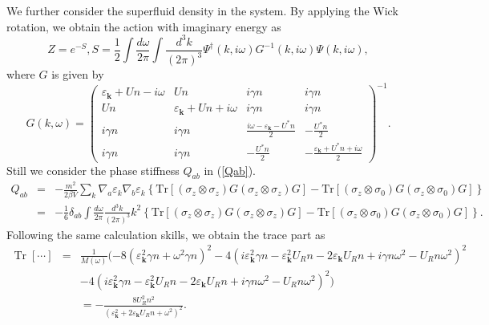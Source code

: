 \documentclass{article}
\newcommand{\nobracket}{}
\newcommand{\tmmathbf}[1]{\ensuremath{\boldsymbol{#1}}}
\newcommand{\tmop}[1]{\ensuremath{\operatorname{#1}}}
\begin{document}
We further consider the superfluid density in the system. By applying the
Wick rotation, we obtain the action with imaginary energy as
\begin{equation}
  Z = e^{- S}, S = \frac{1}{2} \int \frac{d \omega}{2 \pi} \int \frac{d^3
  k}{(2 \pi)^3} \Psi^{\dagger} (k, i \omega) G^{- 1} (k, i \omega) \Psi (k, i
  \omega),
\end{equation}
where $G$ is given by
\begin{equation}
  G (k, \omega) = \left(\begin{array}{cccc}
    \varepsilon_{\tmmathbf{k}} + U n - i \omega & U n & i \gamma n & i \gamma
    n\\
    U n & \varepsilon_{\tmmathbf{k}} + U n + i \omega & i \gamma n & i \gamma
    n\\
    i \gamma n & i \gamma n & \frac{i \omega - \varepsilon_{\tmmathbf{k}} -
    U^{\ast} n}{2} & - \frac{U^{\ast} n}{2}\\
    i \gamma n & i \gamma n & - \frac{U^{\ast} n}{2} & -
    \frac{\varepsilon_{\tmmathbf{k}} + U^{\ast} n + i \omega}{2}
  \end{array}\right)^{- 1} .
\end{equation}
Still we consider the phase stiffness $Q_{a b}$ in (\ref{Qab}).
\begin{eqnarray}
  Q_{a b} & = & - \frac{m^2}{2 \beta V} \sum_k \nabla_a \varepsilon_k \nabla_b
  \varepsilon_k \left\{ \text{Tr} [(\sigma_z \otimes \sigma_z) G (\sigma_z
  \otimes \sigma_z) G] - \text{Tr} [(\sigma_z \otimes \sigma_0) G (\sigma_z
  \otimes \sigma_0) G] \right\} \nonumber\\
  & = & - \frac{1}{6} \delta_{a b} \int \frac{d \omega}{2 \pi} \frac{d^3
  k}{(2 \pi)^3} k^2 \left\{ \text{Tr} [(\sigma_z \otimes \sigma_z) G (\sigma_z
  \otimes \sigma_z) G] - \text{Tr} [(\sigma_z \otimes \sigma_0) G (\sigma_z
  \otimes \sigma_0) G] \right\} . 
\end{eqnarray}
Following the same calculation skills, we obtain the trace part as
\begin{eqnarray}
  \tmop{Tr} [\cdots] & = & \frac{1}{M (\omega)} (- 8
  (\varepsilon_{\tmmathbf{k}}^2 \gamma n + \omega^2 \gamma n)^2 - 4 (i
  \varepsilon_{\tmmathbf{k}}^2 \gamma n - \varepsilon_{\tmmathbf{k}}^2 U_R n -
  2 \varepsilon_{\tmmathbf{k}} U_R n + i \gamma n \omega^2 - U_R n \omega^2)^2
  \nobracket \nonumber\\
  &  & - 4 (i \varepsilon_{\tmmathbf{k}}^2 \gamma n -
  \varepsilon_{\tmmathbf{k}}^2 U_R n - 2 \varepsilon_{\tmmathbf{k}} U_R n + i
  \gamma n \omega^2 - U_R n \omega^2)^2 \nobracket) \nonumber\\
  &  & = - \frac{8 U_R^2 n^2}{(\varepsilon_{\tmmathbf{k}}^2 + 2
  \varepsilon_{\tmmathbf{k}} U_R n + \omega^2)^2} . 
\end{eqnarray}
\end{document}
